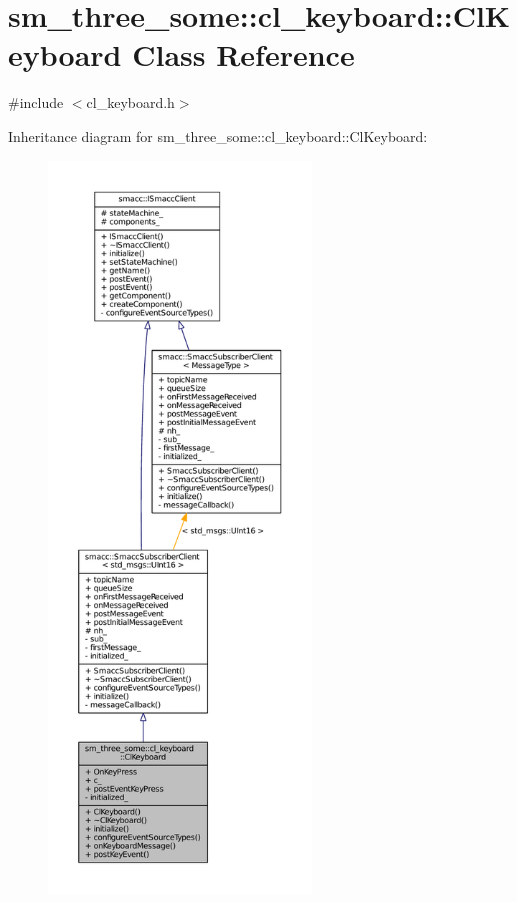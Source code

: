 \hypertarget{classsm__three__some_1_1cl__keyboard_1_1ClKeyboard}{}\section{sm\+\_\+three\+\_\+some\+:\+:cl\+\_\+keyboard\+:\+:Cl\+Keyboard Class Reference}
\label{classsm__three__some_1_1cl__keyboard_1_1ClKeyboard}


{\ttfamily \#include $<$cl\+\_\+keyboard.\+h$>$}



Inheritance diagram for sm\+\_\+three\+\_\+some\+:\+:cl\+\_\+keyboard\+:\+:Cl\+Keyboard\+:
\nopagebreak
\begin{figure}[H]
\begin{center}
\leavevmode
\includegraphics[height=550pt]{classsm__three__some_1_1cl__keyboard_1_1ClKeyboard__inherit__graph}
\end{center}
\end{figure}


